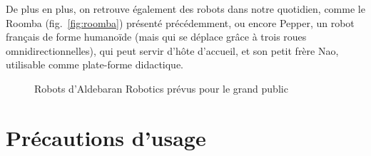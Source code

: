 \documentclass[french,A4paper,]{book}
\begin{document}
De plus en plus, on retrouve également des robots dans notre quotidien,
comme le Roomba (fig.~\ref{fig:roomba}) présenté précédemment, ou encore
Pepper, un robot français de forme humanoïde (mais qui se déplace grâce
à trois roues omnidirectionnelles), qui peut servir d'hôte d'accueil, et
son petit frère Nao, utilisable comme plate-forme didactique.

\begin{figure}
\centering

\hspace*{\fill}
\hfill%
\hspace*{\fill}

\caption{Robots d'Aldebaran Robotics prévus pour le grand public}

\label{fig:aldebaran}

\end{figure}

\section{Précautions d'usage}\label{sec:precautions}
\end{document}
